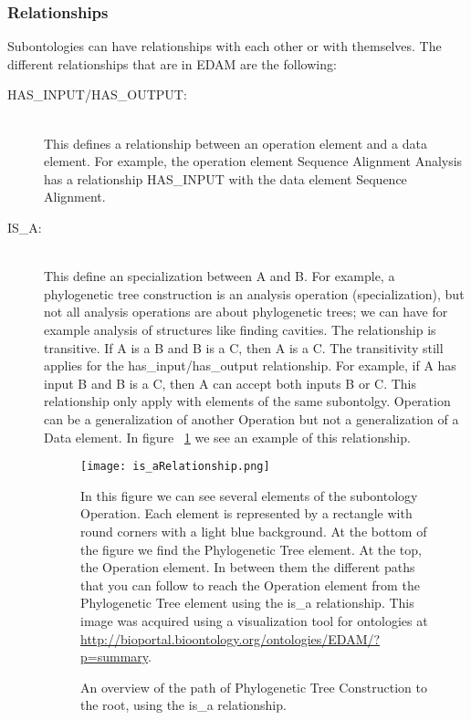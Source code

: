 \documentclass[a4paper,10pt]{article}
\begin{document}
    \subsubsection{Relationships}
    \label{sec:ontologyRelationships}

    Subontologies can have relationships with each other or with themselves. The different relationships that are in EDAM are the following:

    \begin{description}
	\item[HAS\_INPUT/HAS\_OUTPUT:] \hfill \\
	This defines a relationship between an operation element and a data element. For example, the operation element Sequence Alignment Analysis has a relationship HAS\_INPUT with the data element Sequence Alignment.

	\item[IS\_A:] \hfill \\
	This define an specialization between A and B. For example, a phylogenetic tree construction is an analysis operation (specialization), but not all analysis operations are about phylogenetic trees; we can have for example analysis of structures like finding cavities. The relationship is transitive. If A is a B and B is a C, then A is a C. The transitivity still applies for the has\_input/has\_output relationship. For example, if A has input B and B is a C, then A can accept both inputs B or C. This relationship only apply with elements of the same subontolgy. Operation can be a generalization of another Operation but not a generalization of a Data element. In figure ~\ref{fig:isaRelation} we see an example of this relationship.

	\begin{figure}[H]
	{\centering
	\texttt{[image: is\_aRelationship.png]}
	\caption{An overview of the path of Phylogenetic Tree Construction to the root, using the is\_a relationship.} \label{fig:isaRelation}}
	\medskip
	\small
	In this figure we can see several elements of the subontology Operation. Each element is represented by a rectangle with round corners with a light blue background. At the bottom of the figure we find the Phylogenetic Tree element. At the top, the Operation element. In between them the different paths that you can follow to reach the Operation element from the Phylogenetic Tree element using the is\_a relationship. This image was acquired using a visualization tool for ontologies at \url{http://bioportal.bioontology.org/ontologies/EDAM/?p=summary}.
	\end{figure}


\end{description}
\end{document}
